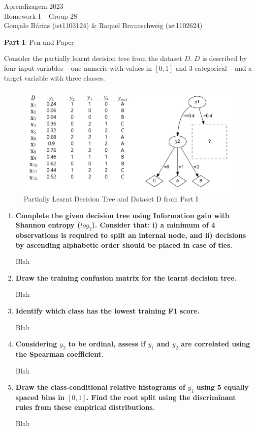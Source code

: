 \documentclass[12pt]{article}
\begin{document}
\begin{center}
\large{Aprendizagem 2023}\\
Homework I -- Group 28\\
\vskip 0.3cm
Gonçalo Bárias (ist1103124) \& Raquel Braunschweig (ist1102624)\vskip 1cm

\large{\textbf{Part I}: Pen and Paper}\normalsize
\end{center}

\noindent Consider the partially learnt decision tree from the dataset $D$. $D$ is described by four input variables –
one numeric with values in $[0,1]$ and 3 categorical – and a target variable with three classes.

\begin{figure}[H]
    \centering
    \includegraphics[width=15cm]{partial_tree_dataset_d}
    \caption{Partially Learnt Decision Tree and Dataset D from Part I}
    \label{fig:partial-decision-tree-dataset-d}
\end{figure}

\begin{enumerate}[leftmargin=\labelsep]
    \item \textbf{Complete the given decision tree using Information gain with Shannon entropy ($log_2$).
    Consider that: i) a minimum of 4 observations is required to split an internal node, and
    ii) decisions by ascending alphabetic order should be placed in case of ties.}

    Blah

    \item \textbf{Draw the training confusion matrix for the learnt decision tree.}

    Blah

    \item \textbf{Identify which class has the lowest training F1 score.}

    Blah

    \item \textbf{Considering $y_2$ to be ordinal, assess if $y_1$ and $y_2$ are correlated using the Spearman coefficient.}

    Blah

    \item \textbf{Draw the class-conditional relative histograms of $y_1$ using 5 equally spaced bins in $[0,1]$.
    Find the root split using the discriminant rules from these empirical distributions.}

    Blah
\end{enumerate}
\end{document}
